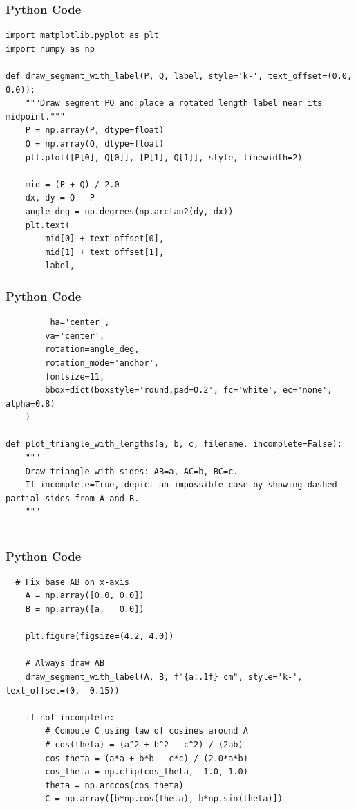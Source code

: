 \documentclass{beamer}
\begin{document}
\begin{frame}[fragile]
    \frametitle{Python Code}
    \begin{lstlisting}
import matplotlib.pyplot as plt
import numpy as np

def draw_segment_with_label(P, Q, label, style='k-', text_offset=(0.0, 0.0)):
    """Draw segment PQ and place a rotated length label near its midpoint."""
    P = np.array(P, dtype=float)
    Q = np.array(Q, dtype=float)
    plt.plot([P[0], Q[0]], [P[1], Q[1]], style, linewidth=2)

    mid = (P + Q) / 2.0
    dx, dy = Q - P
    angle_deg = np.degrees(np.arctan2(dy, dx))
    plt.text(
        mid[0] + text_offset[0],
        mid[1] + text_offset[1],
        label,
    \end{lstlisting}
\end{frame}

\begin{frame}[fragile]
    \frametitle{Python Code}
    \begin{lstlisting}
         ha='center',
        va='center',
        rotation=angle_deg,
        rotation_mode='anchor',
        fontsize=11,
        bbox=dict(boxstyle='round,pad=0.2', fc='white', ec='none', alpha=0.8)
    )

def plot_triangle_with_lengths(a, b, c, filename, incomplete=False):
    """
    Draw triangle with sides: AB=a, AC=b, BC=c.
    If incomplete=True, depict an impossible case by showing dashed partial sides from A and B.
    """
   
    \end{lstlisting}
\end{frame}

\begin{frame}[fragile]
    \frametitle{Python Code}
    \begin{lstlisting}
  # Fix base AB on x-axis
    A = np.array([0.0, 0.0])
    B = np.array([a,   0.0])

    plt.figure(figsize=(4.2, 4.0))

    # Always draw AB
    draw_segment_with_label(A, B, f"{a:.1f} cm", style='k-', text_offset=(0, -0.15))

    if not incomplete:
        # Compute C using law of cosines around A
        # cos(theta) = (a^2 + b^2 - c^2) / (2ab)
        cos_theta = (a*a + b*b - c*c) / (2.0*a*b)
        cos_theta = np.clip(cos_theta, -1.0, 1.0)
        theta = np.arccos(cos_theta)
        C = np.array([b*np.cos(theta), b*np.sin(theta)])

    \end{lstlisting}
\end{frame}
\end{document}

